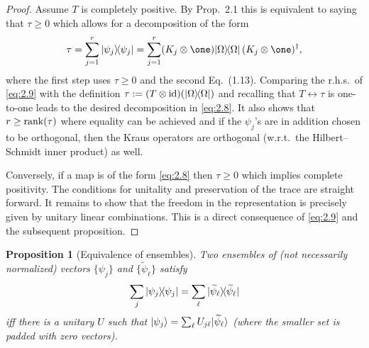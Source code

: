 \documentclass[11pt,a4paper]{article}
\numberwithin{equation}{section}
\theoremstyle{plain}
\newtheorem{proposition}{Proposition}[section]
\theoremstyle{definition}
\begin{document}
\begin{proof}
    Assume $T$ is completely positive. By Prop.~2.1 this is equivalent to saying that
    $\tau \ge 0$ which allows for a decomposition of the form
    \begin{equation}\label{eq:2.9}
        \tau = \sum_{j=1}^r \ketbra{\psi_j}{\psi_j}
        = \sum_{j=1}^r (K_j \otimes \one) \ketbra{\Omega}{\Omega}\,(K_j \otimes \one)^\dagger,
    \end{equation}
    where the first step uses $\tau \ge 0$ and the second Eq.~(1.13). Comparing the
    r.h.s.\ of \eqref{eq:2.9} with the definition $\tau := (T \otimes \mathrm{id})(|\Omega\rangle\!\langle\Omega|)$
    and recalling that $T \leftrightarrow \tau$ is one-to-one leads to the desired
    decomposition in \eqref{eq:2.8}. It also shows that $r \ge \operatorname{rank}(\tau)$ where
    equality can be achieved and if the $\psi_j$'s are in addition chosen to be
    orthogonal, then the Kraus operators are orthogonal (w.r.t.\ the Hilbert--Schmidt
    inner product) as well.

    Conversely, if a map is of the form \eqref{eq:2.8} then $\tau \ge 0$ which implies
    complete positivity. The conditions for unitality and preservation of the trace are
    straight forward. It remains to show that the freedom in the representation is
    precisely given by unitary linear combinations. This is a direct consequence of
    \eqref{eq:2.9} and the subsequent proposition.
\end{proof}

\begin{proposition}[Equivalence of ensembles]
    Two ensembles of (not necessarily normalized) vectors $\{\psi_j\}$ and
    $\{\widetilde{\psi}_\ell\}$ satisfy
    \begin{equation}\label{eq:2.10}
        \sum_j |\psi_j\rangle\!\langle\psi_j| = \sum_\ell |\widetilde{\psi}_\ell\rangle\!\langle\widetilde{\psi}_\ell|
    \end{equation}
    iff there is a unitary $U$ such that
    $|\psi_j\rangle = \sum_\ell U_{j\ell}|\widetilde{\psi}_\ell\rangle$
    (where the smaller set is padded with zero vectors).
\end{proposition}
\end{document}

